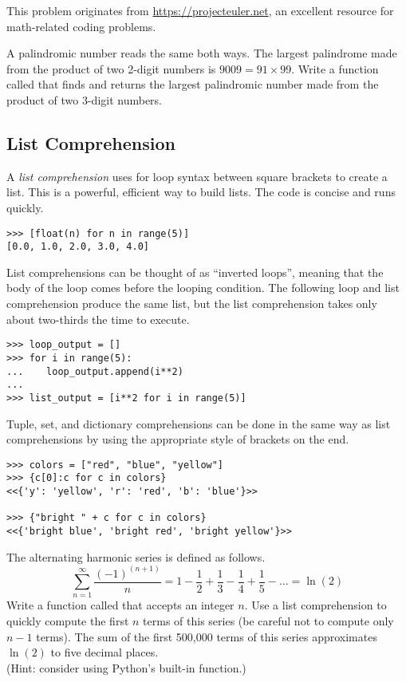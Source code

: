 \begin{problem} %
This problem originates from \url{https://projecteuler.net}, an excellent resource for math-related coding problems.

A palindromic number reads the same both ways.
The largest palindrome made from the product of two 2-digit numbers is $9009 = 91 \times 99.$
Write a function called  that finds and returns the largest palindromic number made from the product of two 3-digit numbers.
\end{problem}

\subsection*{List Comprehension} %

A \emph{list comprehension} uses for loop syntax between square brackets to create a list.
This is a powerful, efficient way to build lists.
The code is concise and runs quickly.

\begin{lstlisting}
>>> [float(n) for n in range(5)]
[0.0, 1.0, 2.0, 3.0, 4.0]
\end{lstlisting}

List comprehensions can be thought of as ``inverted loops'', meaning that the body of the loop comes before the looping condition.
The following loop and list comprehension produce the same list, but the list comprehension takes only about two-thirds the time to execute.

\begin{lstlisting}
>>> loop_output = []
>>> for i in range(5):
...    loop_output.append(i**2)
...
>>> list_output = [i**2 for i in range(5)]
\end{lstlisting}

Tuple, set, and dictionary comprehensions can be done in the same way as list comprehensions by using the appropriate style of brackets on the end.

\begin{lstlisting}
>>> colors = ["red", "blue", "yellow"]
>>> {c[0]:c for c in colors}
<<{'y': 'yellow', 'r': 'red', 'b': 'blue'}>>

>>> {"bright " + c for c in colors}
<<{'bright blue', 'bright red', 'bright yellow'}>>
\end{lstlisting}

\begin{problem} %
The alternating harmonic series is defined as follows.
\[\sum_{n=1}^\infty \frac{(-1)^{(n+1)}}{n} = 1 - \frac{1}{2} + \frac{1}{3} - \frac{1}{4} + \frac{1}{5} - \ldots = \ln(2)\]
Write a function called  that accepts an integer $n$.
Use a list comprehension to quickly compute the first $n$ terms of this series (be careful not to compute only $n-1$ terms).
The sum of the first 500,000 terms of this series approximates $\ln(2)$ to five decimal places.
\\(Hint: consider using Python's built-in  function.)
\end{problem}

